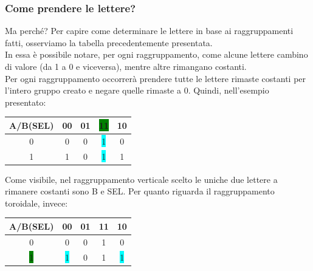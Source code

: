 \documentclass[12pt]{article}
\begin{document}
\subsubsection{Come prendere le lettere?}
Ma perché? Per capire come determinare le lettere in base ai raggruppamenti fatti, osserviamo la tabella precedentemente presentata.\\
In essa è possibile notare, per ogni raggruppamento, come alcune lettere cambino di valore (da 1 a 0 e viceversa), mentre altre rimangano costanti.\\
Per ogni raggruppamento occorrerà prendere tutte le lettere rimaste costanti per l'intero gruppo creato e negare quelle rimaste a 0.
Quindi, nell'esempio presentato:
\begin{center}
    \begin{tabular}{|| c | c c c c ||}
        \hline
        A/B(SEL) & 00 & 01 & \colorbox{green}{11} & 10 \\
        \hline
        0 & 0 & 0 & \colorbox{cyan}{1} & 0 \\
        \hline
        1 & 1 & 0 & \colorbox{cyan}{1} & 1 \\
        \hline
    \end{tabular}
\end{center}
Come visibile, nel raggruppamento verticale scelto le uniche due lettere a rimanere costanti sono B e SEL.
Per quanto riguarda il raggruppamento toroidale, invece:
\begin{center}
    \begin{tabular}{|| c | c c c c ||}
        \hline
        A/B(SEL) & 00 & 01 & 11 & 10 \\
        \hline
        0 & 0 & 0 & 1 & 0 \\
        \hline
        \colorbox{green}{1} & \colorbox{cyan}{1} & 0 & 1 & \colorbox{cyan}{1} \\
        \hline
    \end{tabular}
\end{center}
\end{document}
